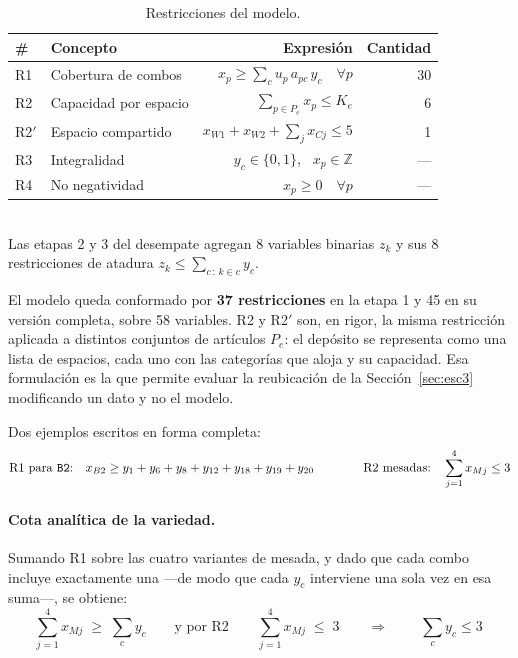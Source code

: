 \documentclass[10pt,a4paper]{article}
\newcommand{\art}[1]{\texttt{#1}}
\begin{document}
\begin{table}[H]
\centering\small
\caption{Restricciones del modelo.}
\label{tab:restricciones}
\begin{tabular}{llrr}
\toprule
\textbf{\#} & \textbf{Concepto} & \textbf{Expresión} & \textbf{Cantidad} \\
\midrule
R1     & Cobertura de combos     & $x_p \geq \sum_c u_p\, a_{pc}\, y_c \quad \forall p$ & 30 \\
R2     & Capacidad por espacio   & $\sum_{p \in P_e} x_p \leq K_e$                      & 6 \\
R2$'$  & Espacio compartido      & $x_{W1}+x_{W2}+\sum_{j} x_{Cj} \leq 5$               & 1 \\
R3     & Integralidad            & $y_c \in \{0,1\}$, \ $x_p \in \mathbb{Z}$            & --- \\
R4     & No negatividad          & $x_p \geq 0 \quad \forall p$                         & --- \\
\bottomrule
\end{tabular}
\vspace{1mm}\\
\footnotesize Las etapas 2 y 3 del desempate agregan 8 variables binarias $z_k$
y sus 8 restricciones de atadura $z_k \leq \sum_{c \,:\, k \in c} y_c$.
\end{table}

El modelo queda conformado por \textbf{37 restricciones} en la etapa 1 y 45 en
su versión completa, sobre 58 variables. R2 y R2$'$ son, en rigor, la misma
restricción aplicada a distintos conjuntos de artículos $P_e$: el depósito se
representa como una lista de espacios, cada uno con las categorías que aloja y
su capacidad. Esa formulación es la que permite evaluar la reubicación de la
Sección~\ref{sec:esc3} modificando un dato y no el modelo.

Dos ejemplos escritos en forma completa:
\[
\text{R1 para \art{B2}:}\quad x_{B2} \geq y_{1}+y_{6}+y_{8}+y_{12}+y_{18}+y_{19}+y_{20}
\qquad\qquad
\text{R2 mesadas:}\quad \sum_{j=1}^{4} x_{Mj} \leq 3
\]

\paragraph{Cota analítica de la variedad.} Sumando R1 sobre las cuatro variantes
de mesada, y dado que cada combo incluye exactamente una —de modo que cada $y_c$
interviene una sola vez en esa suma—, se obtiene:
\[
\sum_{j=1}^{4} x_{Mj} \;\geq\; \sum_{c} y_c
\qquad\text{y por R2}\qquad
\sum_{j=1}^{4} x_{Mj} \;\leq\; 3
\qquad\Longrightarrow\qquad
\boxed{\ \sum_c y_c \leq 3\ }
\]
\end{document}
